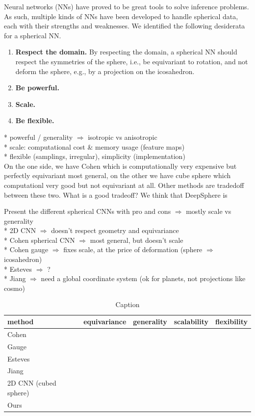\documentclass{article} %
\begin{document}
Neural networks (NNs) have proved to be great tools to solve inference problems. %
As such, multiple kinds of NNs have been developed to handle spherical data, each with their strengths and weaknesses.
We identified the following desiderata for a spherical NN.
\begin{enumerate}
	\item \textbf{Respect the domain.}
		By respecting the domain, a spherical NN should respect the symmetries of the sphere, i.e., be equivariant to rotation, and not deform the sphere, e.g., by a projection on the icosahedron.
	\item \textbf{Be powerful.}
	\item \textbf{Scale.}
	\item \textbf{Be flexible.}
\end{enumerate}
* powerful / generality $\Rightarrow$ isotropic vs anisotropic\\
* scale: computational cost \& memory usage (feature maps)\\
* flexible (samplings, irregular), simplicity (implementation)\\

On the one side, we have Cohen which is computationally very expensive but perfectly equivariant most general, on the other we have cube sphere which computationl very good but not equivariant at all. Other methods are tradedoff between these two. What is a good tradeoff? We think that DeepSphere is

Present the different spherical CNNs with pro and cons $\Rightarrow$ mostly scale vs generality\\
* 2D CNN $\Rightarrow$ doesn't respect geometry and equivariance\\
* Cohen spherical CNN $\Rightarrow$ most general, but doesn't scale\\
* Cohen gauge $\Rightarrow$ fixes scale, at the price of deformation (sphere $\Rightarrow$ icosahedron)\\
* Esteves $\Rightarrow$ ? \\
* Jiang $\Rightarrow$ need a global coordinate system (ok for planets, not projections like cosmo)\\

\begin{table}[b]
    \centering
    \begin{tabular}{l|c|c|c|c}
         method & equivariance & generality & scalability & flexibility \\
         \hline
        Cohen & & & &  \\
         \hline
        Gauge & & & &  \\
         \hline
        Esteves & & & &  \\
         \hline
        Jiang & & & &  \\
         \hline
        2D CNN (cubed sphere) & & & &  \\
         \hline
        Ours & & & &  \\
    \end{tabular}
    \caption{Caption}
    \label{tab:my_label}
\end{table}
\end{document}
